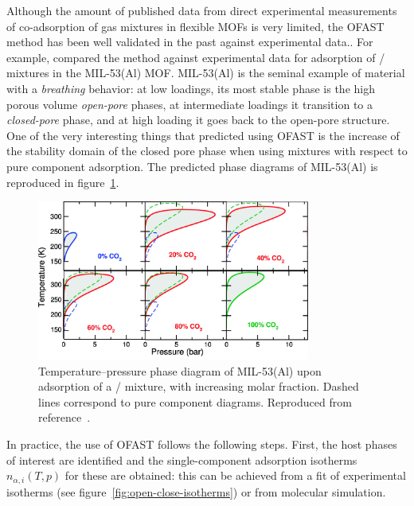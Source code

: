\documentclass[thesis]{subfiles}
\begin{document}
Although the amount of published data from direct experimental measurements of
co-adsorption of gas mixtures in flexible MOFs is very limited, the OFAST method
has been well validated in the past against experimental data.\cite{Ortiz2011,
Hoffmann2011, Zang2011}. For example, \citeauthor{Ortiz2011}\cite{Ortiz2011}
compared the method against experimental data for adsorption of
/ mixtures in the MIL-53(Al) MOF. MIL-53(Al) is the seminal
example of material with a \emph{breathing} behavior: at low loadings, its most
stable phase is the high porous volume \emph{open-pore} phases, at intermediate
loadings it transition to a \emph{closed-pore} phase, and at high loading it
goes back to the open-pore structure. One of the very interesting things that
\citeauthor{Ortiz2011} predicted using OFAST is the increase of the stability
domain of the closed pore phase when using mixtures with respect to pure
component adsorption. The predicted phase diagrams of MIL-53(Al) is reproduced
in figure~\ref{fig:ofast:ortiz}.

\begin{figure}[ht]
    \centering
    \includegraphics[width=0.8\textwidth]{figures/cited/ofast-phase-diagram-rotated}
    \caption{Temperature–pressure phase diagram of MIL-53(Al) upon adsorption
    of a / mixture, with increasing  molar fraction.
    Dashed lines correspond to pure component diagrams.
    Reproduced from reference~\cite{Ortiz2011}.}
    \label{fig:ofast:ortiz}
\end{figure}

In practice, the use of OFAST follows the following steps. First, the host
phases of interest are identified and the single-component adsorption isotherms
$n_{\alpha,i}(T, p)$ for these are obtained: this can be achieved from a fit of
experimental isotherms (see figure~\ref{fig:open-close-isotherms}) or from
molecular simulation.
\end{document}
